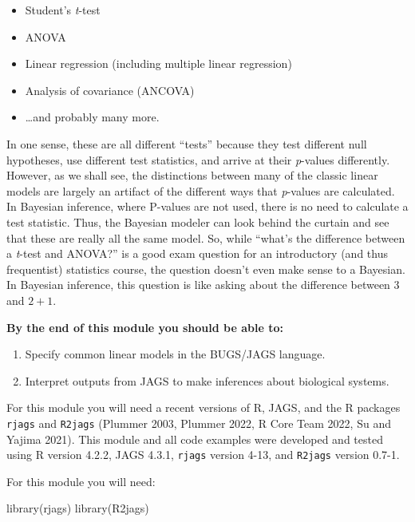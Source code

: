 \documentclass[
  13,
  letterpaper,
]{report}
\newenvironment{Shaded}{\begin{snugshade}}{\end{snugshade}}
\newcommand{\FunctionTok}[1]{\textcolor[rgb]{0.28,0.35,0.67}{#1}}
\newcommand{\NormalTok}[1]{\textcolor[rgb]{0.00,0.23,0.31}{#1}}
\providecommand{\tightlist}{%
  \setlength{\itemsep}{0pt}\setlength{\parskip}{0pt}}
\begin{document}
\begin{itemize}
\tightlist
\item
  Student's \emph{t}-test
\item
  ANOVA
\item
  Linear regression (including multiple linear regression)
\item
  Analysis of covariance (ANCOVA)
\item
  \ldots and probably many more.
\end{itemize}

In one sense, these are all different ``tests'' because they test
different null hypotheses, use different test statistics, and arrive at
their \emph{p}-values differently. However, as we shall see, the
distinctions between many of the classic linear models are largely an
artifact of the different ways that \emph{p}-values are calculated. In
Bayesian inference, where P-values are not used, there is no need to
calculate a test statistic. Thus, the Bayesian modeler can look behind
the curtain and see that these are really all the same model. So, while
``what's the difference between a \emph{t}-test and ANOVA?'' is a good
exam question for an introductory (and thus frequentist) statistics
course, the question doesn't even make sense to a Bayesian. In Bayesian
inference, this question is like asking about the difference between
\(3\) and \(2+1\).

\textbf{By the end of this module you should be able to:}

\begin{enumerate}
\def\labelenumi{\arabic{enumi}.}
\tightlist
\item
  Specify common linear models in the BUGS/JAGS language.
\item
  Interpret outputs from JAGS to make inferences about biological
  systems.
\end{enumerate}

For this module you will need a recent versions of R, JAGS, and the R
packages \texttt{rjags} and \texttt{R2jags} (Plummer 2003, Plummer 2022,
R Core Team 2022, Su and Yajima 2021). This module and all code examples
were developed and tested using R version 4.2.2, JAGS 4.3.1,
\texttt{rjags} version 4-13, and \texttt{R2jags} version 0.7-1.

For this module you will need:

\begin{Shaded}
\begin{Highlighting}[]
\FunctionTok{library}\NormalTok{(rjags)}
\FunctionTok{library}\NormalTok{(R2jags)}
\end{Highlighting}
\end{Shaded}
\end{document}
